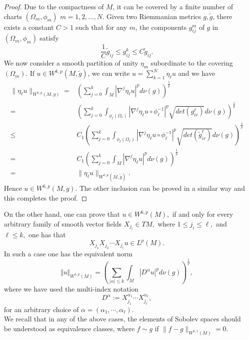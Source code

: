 \documentclass[a4paper,12pt,reqno]{amsart}%
\theoremstyle{definition}
\numberwithin{equation}{section}
\numberwithin{theorem}{section}
\begin{document}
\begin{proof} Due to the compactness of $M$, it can be covered by a finite number of charts $(\Omega_m, \phi_m)$ $m=1,2,\dots, N$. Given two Riemmanian metrics $g, \tilde{g}$, there exists a constant $C>1$  such that for any $m$, the components $g_{ij}^m$ of $g$ in $(\Omega_m, \phi_m)$ satisfy  \\ 
\[\frac{1}{C}\tilde{g}_{ij}\leq g_{ij}^k\leq C \tilde{g}_{ij}.\]
We now consider a smooth partition of unity $\eta_m$ subordinate to the covering  $(\Omega_m)$. If  $u\in W^{k,p}(M,\tilde{g})$, we can write $u=\sum_{k=1}^N \eta_{\ell}u$ and
 we have
\begin{align*} \|\eta_{\ell}u\|_{W^{k,p}(M,g)}=& \left(\sum_{j=0}^k\int_{M}|\nabla^j \eta_{\ell}u|^pd\nu(g)\right)^{\frac{1}{p}} \\
=& \left(\sum_{j=0}^k\int_{\phi_{\ell}(\Omega_{\ell})}|\nabla^j\eta_{\ell}u\circ \phi_{\ell}^{-1}|^p\sqrt{det(g_{ir}^{\ell})}d\nu(g)\right)^{\frac{1}{p}} \\
\leq& C_1\left(\sum_{j=0}^k\int_{\phi_{\ell}(\Omega_{\ell})}|\nabla^j\eta_{\ell}u\circ \phi_{\ell}^{-1}|^p\sqrt{det(\tilde{g}_{ir}^{\ell})}d\nu(g)\right)^{\frac{1}{p}} \\
=& C_1\left(\sum_{j=0}^k\int_{M}|\nabla^j\eta_{\ell}u|^pd\nu(g)\right)^{\frac{1}{p}} \\
=&\|\eta_{\ell}u\|_{W^{k,p}(M,\tilde{g})}.
\end{align*}
Hence  $u\in W^{k,p}(M,{g})$. The other inclusion can be proved in a similar way and this completes the proof.
\end{proof}

On the other hand, one can prove that $u\in W^{k,p}(M),$ if and only for every  arbitrary family of smooth vector fields $X_{j_i}\in TM,$ where  $1\leq j_i\leq \ell,$ and $\ell \leq k,$ one has that
\[ X_{j_1}X_{j_2}\cdots X_{j_\ell} u\in L^{p}(M).  \]
In such a case one has the equivalent norm
\begin{equation}
     \Vert u\Vert_{{W}^{k,p}(M)}=\left(\sum_{|\alpha|\leq k}\int_{M}|D^{\alpha} u|^pd\nu(g)\right)^{\frac{1}{p}},
\end{equation}where we have used the multi-index notation 
\begin{equation}\label{alpha}
 D^{\alpha}:=X_{j_1}^{\alpha_1}\cdots X_{j_\ell}^{\alpha_\ell},   
\end{equation}
for an arbitrary choice of $\alpha=(\alpha_1,\cdots , \alpha_\ell).$\\

We recall that in any of the above cases, the elements of Sobolev spaces should be understood as equivalence classes, where $f\sim g$ if $\|f-g\|_{W^{k,1}(M)}=0$.\\
\end{document}

